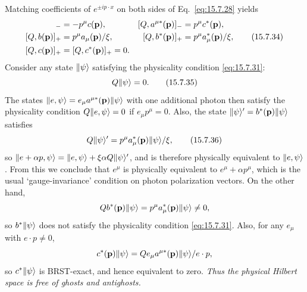 Matching coefficients of $e^{\pm ip\cdot x}$ on both sides of Eq.~\eqref{eq:15.7.28} yields
\begin{align}
 [Q,a^\mu(\mathbf p)]_-&=-p^\mu c(\mathbf p),
 & [Q,a^{\mu*}(\mathbf p)]_-&=p^\mu c^*(\mathbf p),\notag\\
 [Q,b(\mathbf p)]_+&=p^\mu a_\mu(\mathbf p)/\xi,
 & [Q,b^*(\mathbf p)]_+&=p^\mu a_\mu^*(\mathbf p)/\xi,\tag{15.7.34}\label{eq:15.7.34}\\
 [Q,c(\mathbf p)]_+&=[Q,c^*(\mathbf p)]_+=0.\notag
\end{align}
Consider any state $\lVert \psi\rangle$ satisfying the physicality condition \eqref{eq:15.7.31}:
\begin{equation}
 Q\lVert \psi\rangle=0.
 \tag{15.7.35}\label{eq:15.7.35}
\end{equation}
The states $\lVert e,\psi\rangle=e_\mu a^{\mu*}(\mathbf p)\lVert \psi\rangle$ with one additional photon then satisfy the physicality condition $Q\lVert e,\psi\rangle=0$ if $e_\mu p^\mu=0$. Also, the state $\lVert \psi\rangle'=b^*(\mathbf p)\lVert \psi\rangle$ satisfies
\begin{equation}
 Q\lVert \psi\rangle'=p^\mu a_\mu^*(\mathbf p)\lVert \psi\rangle/\xi,
 \tag{15.7.36}\label{eq:15.7.36}
\end{equation}
so $\lVert e+\alpha p,\psi\rangle=\lVert e,\psi\rangle+\xi\alpha Q\lVert \psi\rangle'$, and is therefore physically equivalent to $\lVert e,\psi\rangle$. From this we conclude that $e^\mu$ is physically equivalent to $e^\mu+\alpha p^\mu$, which is the usual `gauge-invariance' condition on photon polarization vectors. On the other hand,
\[
 Qb^*(\mathbf p)\lVert \psi\rangle=p^\mu a_\mu^*(\mathbf p)\lVert \psi\rangle\ne0,
\]
so $b^*\lVert \psi\rangle$ does not satisfy the physicality condition \eqref{eq:15.7.31}. Also, for any $e_\mu$ with $e\cdot p\ne0$,
\[
 c^*(\mathbf p)\lVert \psi\rangle=Qe_\mu a^{\mu*}(\mathbf p)\lVert \psi\rangle/e\cdot p,
\]
so $c^*\lVert \psi\rangle$ is BRST-exact, and hence equivalent to zero. \emph{Thus the physical Hilbert space is free of ghosts and antighosts.}

